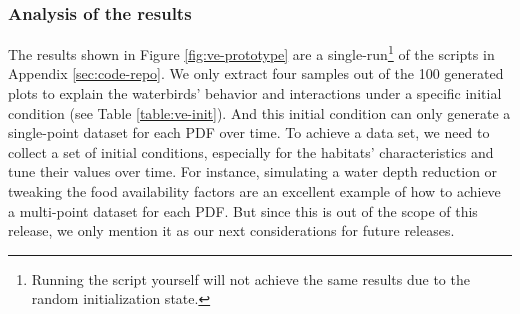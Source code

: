 \subsubsection{Analysis of the results}
The results shown in Figure \ref{fig:ve-prototype} are a single-run\footnote{Running the script yourself will not achieve the same results due to the random initialization state.} of the scripts in Appendix \ref{sec:code-repo}. We only extract four samples out of the 100 generated plots to explain the waterbirds' behavior and interactions under a specific initial condition (see Table \ref{table:ve-init}). And this initial condition can only generate a single-point dataset for each PDF over time. To achieve a data set, we need to collect a set of initial conditions, especially for the habitats' characteristics and tune their values over time. For instance, simulating a water depth reduction or tweaking the food availability factors are an excellent example of how to achieve a multi-point dataset for each PDF. But since this is out of the scope of this release, we only mention it as our next considerations for future releases.

